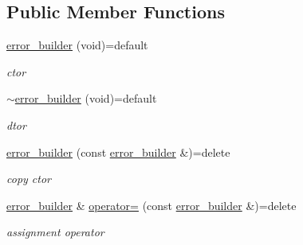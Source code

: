 \subsection*{Public Member Functions}
\begin{DoxyCompactItemize}
\item 
\mbox{\label{classcpp__redis_1_1builders_1_1error__builder_abbc5e14b66702ec8b210fb1d288d2423}} 
\mbox{\hyperlink{classcpp__redis_1_1builders_1_1error__builder_abbc5e14b66702ec8b210fb1d288d2423}{error\+\_\+builder}} (void)=default
\begin{DoxyCompactList}\small\item\em ctor \end{DoxyCompactList}\item 
\mbox{\label{classcpp__redis_1_1builders_1_1error__builder_a7650c178a457c57c2efb19e7ad256fe7}} 
\mbox{\hyperlink{classcpp__redis_1_1builders_1_1error__builder_a7650c178a457c57c2efb19e7ad256fe7}{$\sim$error\+\_\+builder}} (void)=default
\begin{DoxyCompactList}\small\item\em dtor \end{DoxyCompactList}\item 
\mbox{\label{classcpp__redis_1_1builders_1_1error__builder_a2aee65fdc05abfacda73987e2cf60609}} 
\mbox{\hyperlink{classcpp__redis_1_1builders_1_1error__builder_a2aee65fdc05abfacda73987e2cf60609}{error\+\_\+builder}} (const \mbox{\hyperlink{classcpp__redis_1_1builders_1_1error__builder}{error\+\_\+builder}} \&)=delete
\begin{DoxyCompactList}\small\item\em copy ctor \end{DoxyCompactList}\item 
\mbox{\label{classcpp__redis_1_1builders_1_1error__builder_a0b1be51200ff84f17693ee888b03d505}} 
\mbox{\hyperlink{classcpp__redis_1_1builders_1_1error__builder}{error\+\_\+builder}} \& \mbox{\hyperlink{classcpp__redis_1_1builders_1_1error__builder_a0b1be51200ff84f17693ee888b03d505}{operator=}} (const \mbox{\hyperlink{classcpp__redis_1_1builders_1_1error__builder}{error\+\_\+builder}} \&)=delete
\begin{DoxyCompactList}\small\item\em assignment operator \end{DoxyCompactList}\item 

\end{DoxyCompactItemize}
